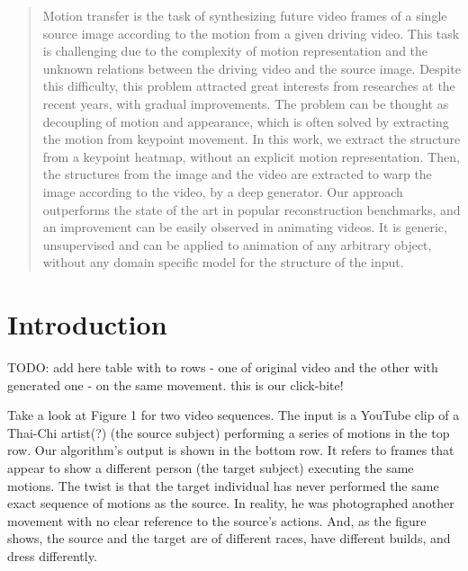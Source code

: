 \documentclass{article}
\begin{document}
\printAffiliationsAndNotice{}

\begin{abstract}
Motion transfer is the task of synthesizing future video frames of a single
source image according to the motion from a given driving video.
This task is challenging due to the complexity of motion representation
and the unknown relations between the driving video and the source image.
Despite this difficulty, this problem attracted great interests from
researches at the recent years, with gradual improvements. The
problem can be thought as decoupling of motion and appearance, which is
often solved by extracting the motion from keypoint movement. In this work,
we extract the structure from a keypoint heatmap, without an explicit
motion representation. Then, the structures from the image and the video
are extracted to warp the image according to the video, by a deep
generator. Our approach outperforms the state of the art in popular
reconstruction benchmarks, and an improvement can be easily observed in
animating videos. It is generic, unsupervised and can be applied to
animation of any arbitrary object, without any domain specific model for the
structure of the input.
\end{abstract}

\section{Introduction}

TODO: add here table with to rows - one of original video and the other with generated one - on the same movement. this is our click-bite!

Take a look at Figure 1 for two video sequences. The input is a YouTube clip of a Thai-Chi artist(?) (the source subject) performing a series of motions in the top row. Our algorithm's output is shown in the bottom row. It refers to frames that appear to show a different person (the target subject) executing the same motions. The twist is that the target individual has never performed the same exact sequence of motions as the source. In reality, he was photographed another movement with no clear reference to the source's actions.
And, as the figure shows, the source and the target are of different races, have different builds, and dress differently.
\end{document}
